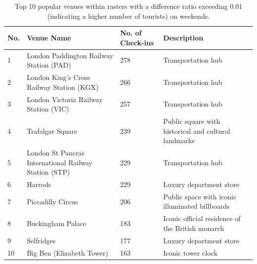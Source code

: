 \documentclass{article}
\theoremstyle{definition}
\theoremstyle{remark}
\begin{document}
\begin{table}[!h]
\centering
\caption{\label{tab:popular_venues_touristspop_weekend}Top 10 popular venues within rasters with a difference ratio exceeding 0.01 (indicating a higher number of tourists) on weekends.}
\begin{adjustbox}{max width=\textwidth, margin=0cm}
\begin{threeparttable}
\begin{tabular}{lp{5cm}lp{4cm}} \hline
No. & Venue Name & No. of Check-ins & Description \\ \hline
1 & London Paddington Railway Station (PAD) & 278 & Transportation hub \\
2 & London King's Cross Railway Station (KGX) & 266 & Transportation hub \\
3 & London Victoria Railway Station (VIC) & 257 & Transportation hub \\
4 & Trafalgar Square & 239 & Public square with historical and cultural landmarks \\
5 & London St Pancras International Railway Station (STP) & 229 & Transportation hub \\
6 & Harrods & 229 & Luxury department store \\
7 & Piccadilly Circus & 206 & Public space with iconic illuminated billboards \\
8 & Buckingham Palace & 183 & Iconic official residence of the British monarch \\
9 & Selfridges & 177 & Luxury department store \\
10 & Big Ben (Elizabeth Tower) & 163 & Iconic tower clock \\ \hline
\end{tabular}
\end{threeparttable}
\end{adjustbox}
\end{table}
\end{document}
